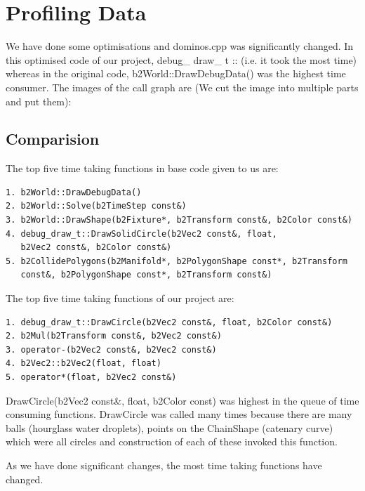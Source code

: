 \documentclass[12pt, a4paper]{article}
\begin{document}
\section{Profiling Data}
We have done some optimisations and dominos.cpp was significantly changed. In this optimised code of our project, debug\_ draw\_ t :: 
 (i.e. it took the most time) whereas in the original code, b2World::DrawDebugData() was the highest time consumer. The images of the call graph are (We cut the image into multiple parts and put them):

\subsection*{Comparision}
The top five time taking functions in base code given to us are:
\begin{verbatim}
1. b2World::DrawDebugData()
2. b2World::Solve(b2TimeStep const&)
3. b2World::DrawShape(b2Fixture*, b2Transform const&, b2Color const&)
4. debug_draw_t::DrawSolidCircle(b2Vec2 const&, float,
   b2Vec2 const&, b2Color const&)
5. b2CollidePolygons(b2Manifold*, b2PolygonShape const*, b2Transform 
   const&, b2PolygonShape const*, b2Transform const&) 
\end{verbatim}

The top five time taking functions of our project are:
\begin{verbatim}
1. debug_draw_t::DrawCircle(b2Vec2 const&, float, b2Color const&)
2. b2Mul(b2Transform const&, b2Vec2 const&)
3. operator-(b2Vec2 const&, b2Vec2 const&)
4. b2Vec2::b2Vec2(float, float)
5. operator*(float, b2Vec2 const&)
\end{verbatim}

DrawCircle(b2Vec2 const\&, float, b2Color const) was highest in the queue of time consuming functions. DrawCircle was called many times because there are many balls (hourglass water droplets), points on the ChainShape (catenary curve) which were all circles and construction of each of these invoked this function.

As we have done significant changes, the most time taking functions have changed. 
\end{document}
